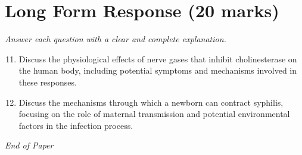 \documentclass[12pt]{article}
\begin{document}
\section*{Long Form Response (20 marks)}
\textit{Answer each question with a clear and complete explanation.}
\begin{enumerate}[label=\arabic*.]
\setcounter{enumi}{10}
\item Discuss the physiological effects of nerve gases that inhibit cholinesterase on the human body, including potential symptoms and mechanisms involved in these responses.
\item Discuss the mechanisms through which a newborn can contract syphilis, focusing on the role of maternal transmission and potential environmental factors in the infection process.
\end{enumerate}

\vfill
\noindent\textit{End of Paper}
\end{document}
